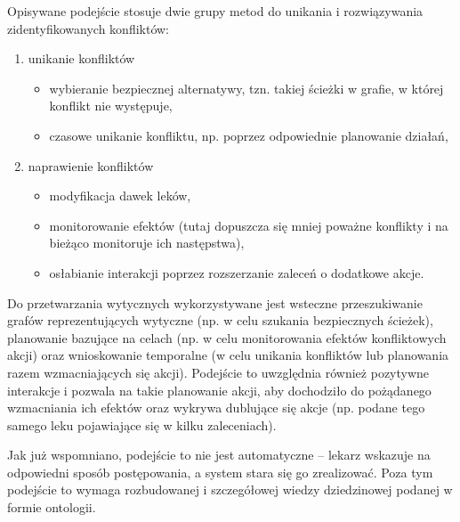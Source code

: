 Opisywane podejście stosuje dwie grupy metod do unikania i rozwiązywania zidentyfikowanych konfliktów:
\begin{enumerate}
	\item unikanie konfliktów
	\begin{itemize}
		\item wybieranie bezpiecznej alternatywy, tzn. takiej ścieżki w grafie, w której konflikt nie występuje,
		\item czasowe unikanie konfliktu, np. poprzez odpowiednie planowanie działań,
	\end{itemize}
	\item naprawienie konfliktów
	\begin{itemize}
		\item modyfikacja dawek leków,
		\item monitorowanie efektów (tutaj dopuszcza się mniej poważne konflikty i na bieżąco monitoruje ich następstwa),
		\item osłabianie interakcji poprzez rozszerzanie zaleceń o dodatkowe akcje.
	\end{itemize}
\end{enumerate}

Do przetwarzania wytycznych wykorzystywane jest wsteczne przeszukiwanie grafów reprezentujących wytyczne (np. w celu szukania bezpiecznych ścieżek), planowanie bazujące na celach (np. w celu monitorowania efektów konfliktowych akcji) oraz wnioskowanie temporalne (w celu unikania konfliktów lub planowania razem wzmacniających się akcji). Podejście to uwzględnia również pozytywne interakcje i pozwala na takie planowanie akcji, aby dochodziło do pożądanego wzmacniania ich efektów oraz wykrywa dublujące się akcje (np. podane tego samego leku pojawiające się w kilku zaleceniach).

Jak już wspomniano, podejście to nie jest automatyczne -- lekarz wskazuje na odpowiedni sposób postępowania, a system stara się go zrealizować. Poza tym podejście to wymaga rozbudowanej i szczegółowej wiedzy dziedzinowej  podanej w formie ontologii.



